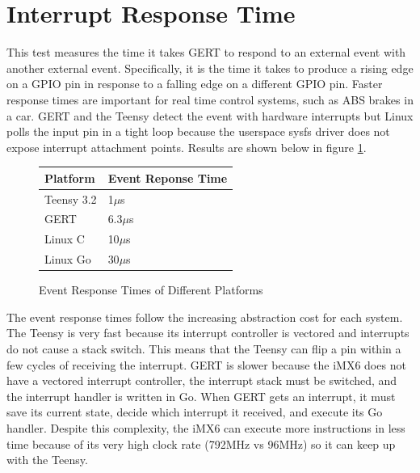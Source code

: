 
\section{Interrupt Response Time}\label{sec:int_time}
This test measures the time it takes GERT to respond to an external event
with another external event. Specifically, it is the time it takes to produce
a rising edge on a GPIO pin in response to a falling edge on a different GPIO pin.
Faster response times are important for real time control systems, such as ABS brakes
in a car.
GERT and the Teensy detect the event with hardware interrupts
but Linux polls the input pin in a tight loop because the userspace sysfs
driver does not expose interrupt attachment points.
Results are shown below in figure \ref{fig:RT}.

\begin{figure} [h]
\begin{center}
  \begin{tabular}{ | l | l |}
    \hline
    Platform & Event Reponse Time \\ \hline
    Teensy 3.2 & 1$\mu$s \\ \hline
    GERT & 6.3$\mu$s \\ \hline
    Linux C & 10$\mu$s \\ \hline
    Linux Go & 30$\mu$s \\
    \hline
  \end{tabular}
\end{center}
  \caption{Event Response Times of Different Platforms}  \label{fig:RT}
\end{figure}

The event response times follow the increasing abstraction cost for each system.
The Teensy is very fast because its interrupt controller is vectored and interrupts
do not cause a stack switch. This means that the Teensy can flip a pin within a few cycles
of receiving the interrupt. GERT is slower because the iMX6 does not have a
vectored interrupt controller, the interrupt stack must be switched, and the
interrupt handler is written in Go. When GERT gets an interrupt, it must save its
current state, decide which interrupt it received, and execute its Go handler. Despite this
complexity, the iMX6 can execute more instructions in less time because of its very
high clock rate (792MHz vs 96MHz) so it can keep up with the Teensy.


